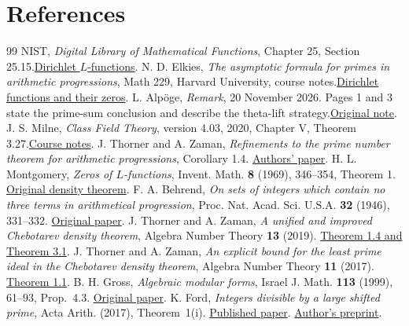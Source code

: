 \documentclass[a4paper,11pt]{article}
\theoremstyle{definition}
\theoremstyle{remark}
\numberwithin{equation}{section}
\begin{document}
\clearpage
\section{References}\label{nav:bibliography-I}
\begingroup{}\begin{thebibliography}{99}\small
{} NIST, \emph{Digital Library of Mathematical Functions}, Chapter 25, Section 25.15.\enspace\href{https://dlmf.nist.gov/25.15}{Dirichlet \(L\)-functions}.
 N. D. Elkies, \emph{The asymptotic formula for primes in arithmetic progressions}, Math 229, Harvard University, course notes.\enspace\href{https://people.math.harvard.edu/~elkies/M229.19/pnt_q.pdf}{Dirichlet functions and their zeros}.
 L. Alp\"oge, \emph{Remark}, 20 November 2026. Pages 1 and 3 state the prime-sum conclusion and describe the theta-lift strategy.\enspace\href{https://alpo.ge/remark.pdf}{Original note}.
 J. S. Milne, \emph{Class Field Theory}, version 4.03, 2020, Chapter V, Theorem 3.27.\enspace\href{https://www.jmilne.org/math/CourseNotes/CFT.pdf}{Course notes}.
 J. Thorner and A. Zaman, \emph{Refinements to the prime number theorem for arithmetic progressions}, Corollary 1.4. \enspace\href{https://arxiv.org/abs/2108.10878}{Authors' paper}.
 H. L. Montgomery, \emph{Zeros of \(L\)-functions}, Invent. Math. \textbf{8} (1969), 346--354, Theorem 1. \enspace\href{https://link.springer.com/article/10.1007/BF01404638}{Original density theorem}.
 F. A. Behrend, \emph{On sets of integers which contain no three terms in arithmetical progression}, Proc. Nat. Acad. Sci. U.S.A. \textbf{32} (1946), 331--332. \href{https://doi.org/10.1073/pnas.32.12.331}{Original paper}.
 J. Thorner and A. Zaman, \emph{A unified and improved Chebotarev density theorem}, Algebra Number Theory \textbf{13} (2019). \href{https://msp.org/ant/2019/13-5/ant-v13-n5-p02-p.pdf}{Theorem 1.4 and Theorem 3.1}.
 J. Thorner and A. Zaman, \emph{An explicit bound for the least prime ideal in the Chebotarev density theorem}, Algebra Number Theory \textbf{11} (2017). \href{https://arxiv.org/abs/1604.01750}{Theorem 1.1}.
 B. H. Gross, \emph{Algebraic modular forms}, Israel J. Math. \textbf{113} (1999), 61--93, Prop.~4.3. \href{https://doi.org/10.1007/BF02780173}{Original paper}.
 K. Ford, \emph{Integers divisible by a large shifted prime}, Acta Arith. (2017), Theorem~1(i). \href{https://doi.org/10.4064/aa8495-2-2017}{Published paper}. \href{https://arxiv.org/pdf/1604.00281}{Author's preprint}.
\end{thebibliography}\endgroup
\end{document}
